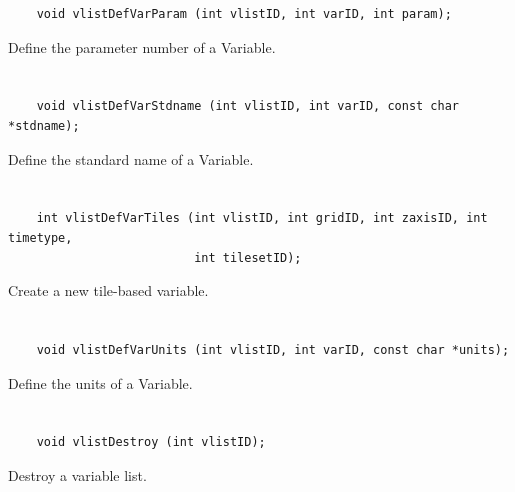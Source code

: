 \begin{verbatim}
    void vlistDefVarParam (int vlistID, int varID, int param);
\end{verbatim}

Define the parameter number of a Variable.


\section*{\tt {}}

\begin{verbatim}
    void vlistDefVarStdname (int vlistID, int varID, const char *stdname);
\end{verbatim}

Define the standard name of a Variable.


\section*{\tt {}}

\begin{verbatim}
    int vlistDefVarTiles (int vlistID, int gridID, int zaxisID, int timetype,
                          int tilesetID);
\end{verbatim}

Create a new tile-based variable.


\section*{\tt {}}

\begin{verbatim}
    void vlistDefVarUnits (int vlistID, int varID, const char *units);
\end{verbatim}

Define the units of a Variable.


\section*{\tt {}}

\begin{verbatim}
    void vlistDestroy (int vlistID);
\end{verbatim}

Destroy a variable list.


\section*{\tt {}}

